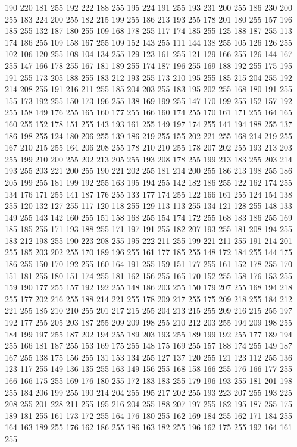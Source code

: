190 220 181 255 192 222 188 255 195 224 191 255 193 231 200 255 186 230 200 255 183 224 200 255 182 215 199 255 186 213 193 255 178 201 180 255 157 196 185 255 132 187 180 255 109 168 178 255 117 174 185 255 125 188 187 255 113 174 186 255 109 158 167 255
109 152 143 255 111 144 138 255 105 126 126 255 102 106 120 255 108 104 134 255 129 123 161 255 121 129 166 255 126 144 167 255 147 166 178 255 167 181 189 255 174 187 196 255 169 188 192 255 175 195 191 255 173 205 188 255 183 212 193 255 173 210 195 255
185 215 204 255 192 214 208 255 191 216 211 255 185 204 203 255 183 195 202 255 168 180 191 255 155 173 192 255 150 173 196 255 138 169 199 255 147 170 199 255 152 157 192 255 158 149 176 255 165 160 177 255 166 160 174 255 170 161 171 255 164 165 160 255
152 178 151 255 143 193 161 255 149 197 174 255 141 194 188 255 137 186 198 255 124 180 206 255 139 186 219 255 155 202 221 255 168 214 219 255 167 210 215 255 164 206 208 255 178 210 210 255 178 207 202 255 193 213 203 255 199 210 200 255 202 213 205 255
193 208 178 255 199 213 183 255 203 214 193 255 203 221 200 255 190 221 202 255 181 214 200 255 186 213 198 255 186 205 199 255 181 199 192 255 163 195 194 255 142 182 186 255 122 162 174 255 134 176 171 255 141 187 176 255 133 177 174 255 122 166 161 255
124 154 138 255 120 132 127 255 117 120 118 255 129 113 113 255 134 121 128 255 148 133 149 255 143 142 160 255 151 158 168 255 154 174 172 255 168 183 186 255 169 185 185 255 171 193 188 255 171 197 191 255 182 207 193 255 181 208 194 255 183 212 198 255
190 223 208 255 195 222 211 255 199 221 211 255 191 214 201 255 185 203 202 255 170 189 196 255 161 177 185 255 148 172 184 255 144 175 186 255 150 170 192 255 160 164 191 255 159 151 177 255 161 152 178 255 170 151 181 255 180 151 174 255 181 162 156 255
165 170 152 255 158 176 153 255 159 190 177 255 157 192 192 255 148 186 203 255 150 179 207 255 168 194 218 255 177 202 216 255 188 214 221 255 178 209 217 255 175 209 218 255 184 212 221 255 185 210 210 255 201 217 215 255 204 213 215 255 209 216 215 255
197 192 177 255 205 203 187 255 209 209 198 255 210 212 203 255 194 209 198 255 184 199 197 255 187 202 194 255 189 203 193 255 189 199 192 255 177 189 194 255 166 181 187 255 153 169 175 255 148 175 169 255 157 188 174 255 149 187 167 255 138 175 156 255
131 153 134 255 127 137 120 255 121 123 112 255 136 123 117 255 149 136 135 255 163 149 156 255 168 158 166 255 176 166 177 255 166 166 175 255 169 176 180 255 172 183 183 255 179 196 193 255 181 201 198 255 184 206 199 255 190 214 204 255 195 217 202 255
193 223 207 255 193 225 208 255 201 228 211 255 195 216 204 255 188 207 197 255 182 195 187 255 175 189 181 255 161 173 172 255 164 176 180 255 162 169 184 255 162 171 184 255 164 163 189 255 176 162 186 255 186 163 182 255 196 162 175 255 192 164 161 255
